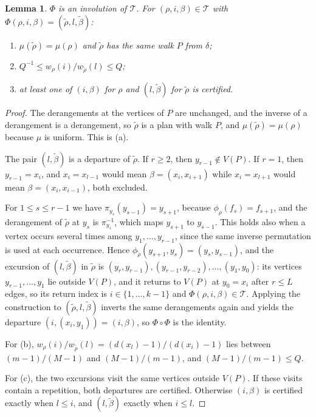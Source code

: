 \documentclass[11pt]{amsart}
\newtheorem{lemma}[theorem]{Lemma}
\theoremstyle{remark}
\begin{document}
\begin{lemma}\label{lem:reversal}
$\Phi$ is an involution of $\mathcal T$. For $(\rho,i,\beta)\in\mathcal T$ with $\Phi(\rho,i,\beta)=(\tilde\rho,l,\tilde\beta)$:
\begin{enumerate}
\item[(a)] $\mu(\tilde\rho)=\mu(\rho)$ and $\tilde\rho$ has the same walk $P$ from $\delta$;
\item[(b)] $Q^{-1}\le w_\rho(i)/w_{\tilde\rho}(l)\le Q$;
\item[(c)] at least one of $(i,\beta)$ for $\rho$ and $(l,\tilde\beta)$ for $\tilde\rho$ is certified.
\end{enumerate}
\end{lemma}

\begin{proof}
The derangements at the vertices of $P$ are unchanged, and the inverse of a derangement is a derangement, so
$\tilde\rho$ is a plan with walk $P$, and $\mu(\tilde\rho)=\mu(\rho)$ because $\mu$ is uniform. This is (a).

The pair $(l,\tilde\beta)$ is a departure of $\tilde\rho$. If $r\ge2$, then $y_{r-1}\notin V(P)$. If $r=1$, then
$y_{r-1}=x_i$, and $x_i=x_{l-1}$ would mean $\beta=(x_i,x_{i+1})$ while $x_i=x_{l+1}$ would mean $\beta=(x_i,x_{i-1})$,
both excluded.

For $1\le s\le r-1$ we have $\pi_{y_s}(y_{s-1})=y_{s+1}$, because $\phi_\rho(f_s)=f_{s+1}$, and the derangement of
$\tilde\rho$ at $y_s$ is $\pi_{y_s}^{-1}$, which maps $y_{s+1}$ to $y_{s-1}$. This holds also when a vertex occurs
several times among $y_1,\dots,y_{r-1}$, since the same inverse permutation is used at each occurrence. Hence
$\phi_{\tilde\rho}(y_{s+1},y_s)=(y_s,y_{s-1})$, and the excursion of $(l,\tilde\beta)$ in $\tilde\rho$ is
$(y_r,y_{r-1}),(y_{r-1},y_{r-2}),\dots,(y_1,y_0)$: its vertices $y_{r-1},\dots,y_1$ lie outside $V(P)$, and it
returns to $V(P)$ at $y_0=x_i$ after $r\le L$ edges, so its return index is $i\in\{1,\dots,k-1\}$ and
$\Phi(\rho,i,\beta)\in\mathcal T$. Applying the construction to $(\tilde\rho,l,\tilde\beta)$ inverts the same
derangements again and yields the departure $(i,(x_i,y_1))=(i,\beta)$, so $\Phi\circ\Phi$ is the identity.

For (b), $w_\rho(i)/w_{\tilde\rho}(l)=(d(x_l)-1)/(d(x_i)-1)$ lies between $(m-1)/(M-1)$ and $(M-1)/(m-1)$, and
$(M-1)/(m-1)\le Q$.

For (c), the two excursions visit the same vertices outside $V(P)$. If these visits contain a repetition, both
departures are certified. Otherwise $(i,\beta)$ is certified exactly when $l\le i$, and $(l,\tilde\beta)$ exactly when
$i\le l$.
\end{proof}
\end{document}
